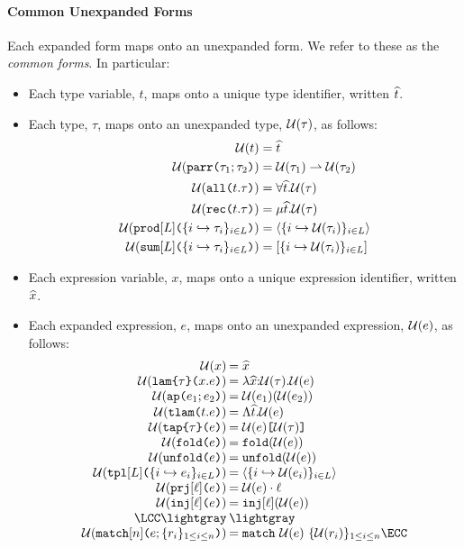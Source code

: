 \paragraph{Common Unexpanded Forms} Each expanded form maps onto an unexpanded form. We refer to these as the \emph{common forms}. In particular:
\begin{itemize}
\item Each type variable, $t$, maps onto a unique {type identifier}, written $\widehat{t}$.
\item Each type, $\tau$, maps onto an unexpanded type, $\mathcal{U}(\tau)$, as follows: 
  \begin{align*}
  \mathcal{U}(t) &= \widehat{t}\\
  \mathcal{U}(\texttt{parr}\texttt{(}\tau_1; \tau_2\texttt{)}) & = \mathcal{U}(\tau_1) \rightharpoonup \mathcal{U}(\tau_2)\\
  \mathcal{U}(\texttt{all}\texttt{(}t.\tau\texttt{)}) & = \forall \widehat{t}.\mathcal{U}(\tau)\\
  \mathcal{U}(\texttt{rec}\texttt{(}t.\tau\texttt{)}) & = \mu \widehat{t}.\mathcal{U}(\tau)\\
  \mathcal{U}(\texttt{prod}[L]\texttt{(}\{i \hookrightarrow \tau_{i}\}_{i \in L}\texttt{)}) & = \langle \{i \hookrightarrow \mathcal{U}(\tau_{i})\}_{i \in L} \rangle\\
  \mathcal{U}(\texttt{sum}[L]\texttt{(}\{i \hookrightarrow \tau_{i}\}_{i \in L}\texttt{)}) & = [\{i \hookrightarrow \mathcal{U}(\tau_{i})\}_{i \in L}]
  \end{align*}
\item Each expression variable, $x$, maps onto a unique expression identifier, written $\widehat{x}$.
\item Each expanded expression, $e$, maps onto an unexpanded expression, $\mathcal{U}(e)$, as follows:
\[\arraycolsep=1pt\begin{array}{rl}
\Uof{x} & = \sigilof{x}\\
\Uof{\aelam{\tau}{x}{e}} & = \lam{\sigilof{x}}{\Uof{\tau}}{\Uof{e}}\\
\Uof{\aeap{e_1}{e_2}} & = \ap{\Uof{e_1}}{\Uof{e_2}}\\
\Uof{\aetlam{t}{e}} & = \Lam{\sigilof{t}}{\Uof{e}}\\
\Uof{\aetap{e}{\tau}} & = \App{\Uof{e}}{\Uof{\tau}}\\
\Uof{\aefold{e}} & = \fold{\Uof e}\\
\Uof{\aeunfold{e}} & = \unfold{\Uof{e}}\\
\Uof{\aetpl{\labelset}{\mapschema{e}{i}{\labelset}}} & = \tpl{\mapschemax{\Uofv}{e}{i}{\labelset}}\\
\Uof{\aepr{\ell}{e}} & = \prj{\Uof{e}}{\ell}\\
\Uof{\aein{\ell}{e}} &= \inj{\ell}{\Uof{e}}\\
\LCC \lightgray & \lightgray \\
\Uof{\aematchwith{n}{e}{\seqschemaX{r}}} & = \matchwith{\Uof{e}}{\seqschemaXx{\Uofv}{r}}\ECC
\end{array}\]
\end{itemize}
